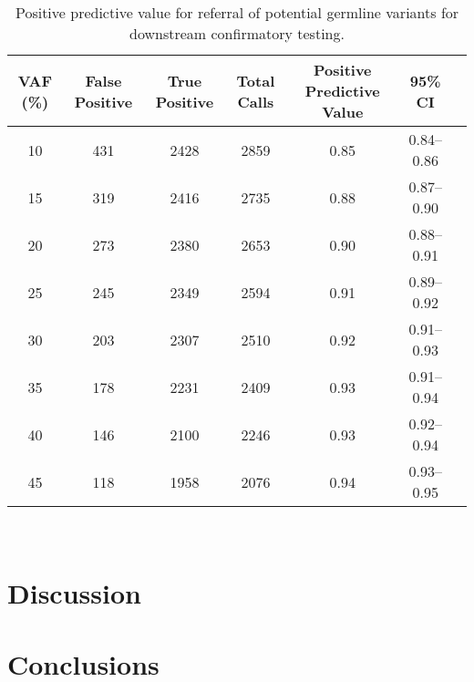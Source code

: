 \documentclass{bmcart}
\begin{document}
\begin{table}[H]
\caption{Positive predictive value for referral of potential germline variants for downstream confirmatory testing.}
\label{ppv}
\centering
      \begin{tabular}{ccccccl}
        \hline
        VAF (\%) & False Positive & True Positive & Total Calls & Positive Predictive Value & 95\% CI
        \\
        \hline
        10 & 431 & 2428 & 2859 & 0.85 & 0.84--0.86
        \\
        15 & 319 & 2416 & 2735 & 0.88 & 0.87--0.90
        \\
        20 & 273 & 2380 & 2653 & 0.90 & 0.88--0.91
        \\
        25 & 245 & 2349 & 2594 & 0.91 & 0.89--0.92
        \\
        30 & 203 & 2307 & 2510 & 0.92 & 0.91--0.93
        \\
        35 & 178 & 2231 & 2409 & 0.93 & 0.91--0.94
        \\
        40 & 146 & 2100 & 2246 & 0.93 & 0.92--0.94
        \\
        45 & 118 & 1958 & 2076 & 0.94 & 0.93--0.95
        \\
				\hline
      \end{tabular} \\
\end{table}

\section*{Discussion}

\section*{Conclusions}

\end{document}
